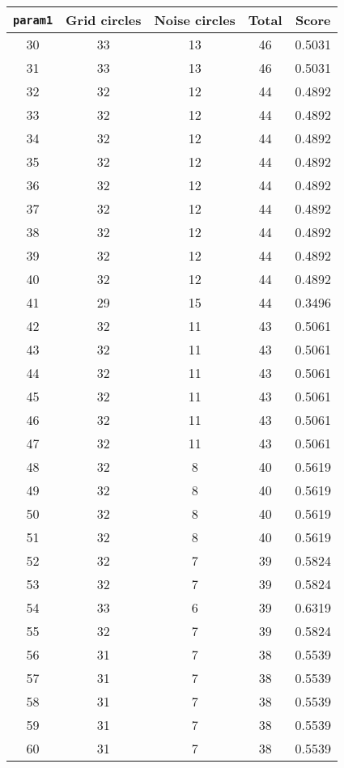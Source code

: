 \documentclass[letterpaper, 12pt]{article}
\begin{document}
\begin{longtable}{|c|c|c|c|c|}
\hline
\textbf{\texttt{param1}} & \textbf{Grid circles} & \textbf{Noise circles} & \textbf{Total} & \textbf{Score} \\
\hline
30 & 33 & 13 & 46 & 0.5031 \\
\hline
31 & 33 & 13 & 46 & 0.5031 \\
\hline
32 & 32 & 12 & 44 & 0.4892 \\
\hline
33 & 32 & 12 & 44 & 0.4892 \\
\hline
34 & 32 & 12 & 44 & 0.4892 \\
\hline
35 & 32 & 12 & 44 & 0.4892 \\
\hline
36 & 32 & 12 & 44 & 0.4892 \\
\hline
37 & 32 & 12 & 44 & 0.4892 \\
\hline
38 & 32 & 12 & 44 & 0.4892 \\
\hline
39 & 32 & 12 & 44 & 0.4892 \\
\hline
40 & 32 & 12 & 44 & 0.4892 \\
\hline
41 & 29 & 15 & 44 & 0.3496 \\
\hline
42 & 32 & 11 & 43 & 0.5061 \\
\hline
43 & 32 & 11 & 43 & 0.5061 \\
\hline
44 & 32 & 11 & 43 & 0.5061 \\
\hline
45 & 32 & 11 & 43 & 0.5061 \\
\hline
46 & 32 & 11 & 43 & 0.5061 \\
\hline
47 & 32 & 11 & 43 & 0.5061 \\
\hline
48 & 32 & 8 & 40 & 0.5619 \\
\hline
49 & 32 & 8 & 40 & 0.5619 \\
\hline
50 & 32 & 8 & 40 & 0.5619 \\
\hline
51 & 32 & 8 & 40 & 0.5619 \\
\hline
52 & 32 & 7 & 39 & 0.5824 \\
\hline
53 & 32 & 7 & 39 & 0.5824 \\
\hline
54 & 33 & 6 & 39 & 0.6319 \\
\hline
55 & 32 & 7 & 39 & 0.5824 \\
\hline
56 & 31 & 7 & 38 & 0.5539 \\
\hline
57 & 31 & 7 & 38 & 0.5539 \\
\hline
58 & 31 & 7 & 38 & 0.5539 \\
\hline
59 & 31 & 7 & 38 & 0.5539 \\
\hline
60 & 31 & 7 & 38 & 0.5539 \\

\end{longtable}
\end{document}
